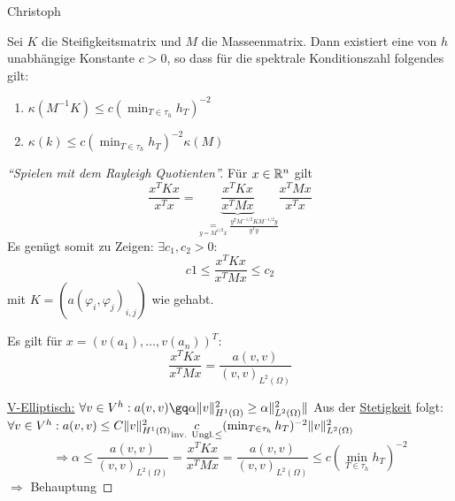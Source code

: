 Christoph

\begin{satz}%
  Sei $K$ die Steifigkeitsmatrix und $M$ die Masseenmatrix. Dann existiert eine von $h$ unabhängige Konstante $c>0$, so dass für die spektrale Konditionszahl folgendes gilt:
  \begin{enumerate}
    \item $\kappa(M^{-1}K) \leq c(\min_{T\in\tau_h} h_T)^{-2}$
    \item $\kappa(k) \leq c(\min_{T\in\tau_h} h_T)^{-2} \kappa(M)$
  \end{enumerate}
\end{satz}

\begin{proof}[``Spielen mit dem Rayleigh Quotienten'']
  Für $x\in\mathbb{R}^n$ gilt
  \[
    \frac{x^TKx}{x^Tx} = \underbrace{\frac{x^TKx}{x^TMx}}_{\underset{y=M^{1/2}x}{=}\frac{y^TM^{-1/2}KM^{-1/2}y}{y^Ty}} \frac{x^TMx}{x^Tx}
  \]
  Es genügt somit zu Zeigen: $\exists c_1, c_2 >0:$
  \[
    c1 \leq \frac{x^TKx}{x^TMx} \leq c_2
  \]
  mit $K=(a(\varphi_i, \varphi_j)_{i,j})$ wie gehabt. 

  Es gilt für $x=(v(a_1),\ldots, v(a_n))^T$:
  \[
    \frac{x^TKx}{x^TMx} = \frac{a(v,v)}{(v,v)_{L^2(\Omega)}}
  \]

  \underline{V-Elliptisch:} $\forall v\in V^h: a(v,v) \gq \alpha \norm{v}^2_{H^1(\Omega)} \geq \alpha \norm{^2_{L^2(\Omega)}}$
  Aus der \underline{Stetigkeit} folgt: $\forall v\in V^h: a(v,v) \leq C \|v\|^2_{H^1(\Omega)} \underset{\text{inv. Ungl.}{\leq}} c(\min_{T\in\tau_h} h_T)^{-2} \|v\|^2_{L^2(\Omega)}$
  \[
    \Rightarrow \alpha \leq \frac{a(v,v)}{(v,v)_{L^2(\Omega)}} = \frac{x^TKx}{x^TMx} = \frac{a(v,v)}{(v,v)_{L^2(\Omega)}} \leq c(\min_{T\in\tau_h}h_T)^{-2}
  \]
  $\Rightarrow$ Behauptung
\end{proof}
